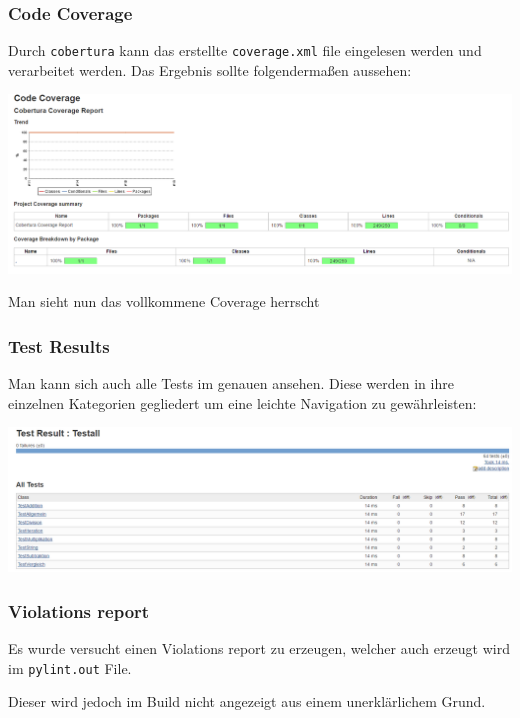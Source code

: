 \subsubsection{Code Coverage}
Durch \verb|cobertura| kann das erstellte \verb|coverage.xml| file eingelesen werden und verarbeitet werden. Das Ergebnis sollte folgendermaßen aussehen:

\begin{minipage}{\linewidth}
	\centering
	\includegraphics[width=1\linewidth]{images/coverage}
\end{minipage}

Man sieht nun das vollkommene Coverage herrscht

\subsubsection{Test Results}
Man kann sich auch alle Tests im genauen ansehen. Diese werden in ihre einzelnen Kategorien gegliedert um eine leichte Navigation zu gewährleisten:

\begin{minipage}{\linewidth}
	\centering
	\includegraphics[width=1\linewidth]{images/tests}
\end{minipage}

\subsubsection{Violations report}
Es wurde versucht einen Violations report zu erzeugen, welcher auch erzeugt wird im \verb|pylint.out| File.

Dieser wird jedoch im Build nicht angezeigt aus einem unerklärlichem Grund. 